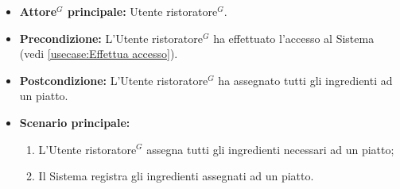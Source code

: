 \label{usecase:Assegnamento ingredienti ad un piatto}
\begin{itemize}
	\item \textbf{\gls{Attore}$^G$ principale:} \gls{Utente ristoratore}$^G$.

	\item \textbf{Precondizione:} L'\gls{Utente ristoratore}$^G$ ha effettuato l'accesso al Sistema (vedi \autoref{usecase:Effettua accesso}).


	\item \textbf{Postcondizione:}
	      L'\gls{Utente ristoratore}$^G$ ha assegnato tutti gli ingredienti ad un piatto.

	\item \textbf{Scenario principale:}
	      \begin{enumerate}
		      \item L'\gls{Utente ristoratore}$^G$ assegna tutti gli ingredienti necessari ad un piatto;

		      \item Il Sistema registra gli ingredienti assegnati ad un piatto.
        \end{enumerate}
\end{itemize}
